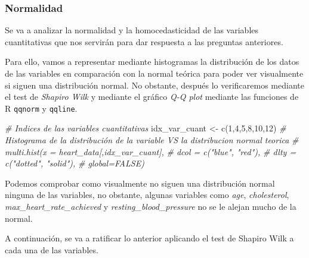 \documentclass[
]{article}
\newenvironment{Shaded}{\begin{snugshade}}{\end{snugshade}}
\newcommand{\CommentTok}[1]{\textcolor[rgb]{0.56,0.35,0.01}{\textit{#1}}}
\newcommand{\DecValTok}[1]{\textcolor[rgb]{0.00,0.00,0.81}{#1}}
\newcommand{\FunctionTok}[1]{\textcolor[rgb]{0.00,0.00,0.00}{#1}}
\newcommand{\NormalTok}[1]{#1}
\newcommand{\OtherTok}[1]{\textcolor[rgb]{0.56,0.35,0.01}{#1}}
\begin{document}
\hypertarget{normalidad}{%
\subsubsection{Normalidad}\label{normalidad}}

Se va a analizar la normalidad y la homocedasticidad de las variables
cuantitativas que nos servirán para dar respuesta a las preguntas
anteriores.

Para ello, vamos a representar mediante histogramas la distribución de
los datos de las variables en comparación con la normal teórica para
poder ver visualmente si siguen una distribución normal. No obstante,
después lo verificaremos mediante el test de \emph{Shapiro Wilk} y
mediante el gráfico \emph{Q-Q plot} mediante las funciones de R
\texttt{qqnorm} y \texttt{qqline}.

\begin{Shaded}
\begin{Highlighting}[]
\CommentTok{\# Indices de las variables cuantitativas}
\NormalTok{idx\_var\_cuant }\OtherTok{\textless{}{-}} \FunctionTok{c}\NormalTok{(}\DecValTok{1}\NormalTok{,}\DecValTok{4}\NormalTok{,}\DecValTok{5}\NormalTok{,}\DecValTok{8}\NormalTok{,}\DecValTok{10}\NormalTok{,}\DecValTok{12}\NormalTok{)}
\CommentTok{\# Histograma de la distribución de la variable VS la distribucion normal teorica}
\CommentTok{\# multi.hist(x = heart\_data[,idx\_var\_cuant], }
\CommentTok{\#             dcol = c("blue", "red"), }
\CommentTok{\#             dlty = c("dotted", "solid"),}
\CommentTok{\#             global=FALSE)}
\end{Highlighting}
\end{Shaded}

Podemos comprobar como visualmente no siguen una distribución normal
ninguna de las variables, no obstante, algunas variables como
\emph{age}, \emph{cholesterol}, \emph{max\_heart\_rate\_achieved} y
\emph{resting\_blood\_pressure} no se le alejan mucho de la normal.

A continuación, se va a ratificar lo anterior aplicando el test de
Shapiro Wilk a cada una de las variables.
\end{document}
